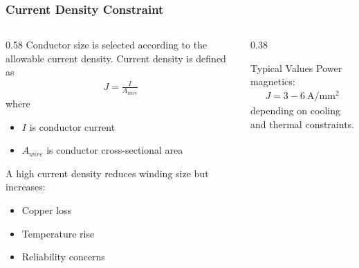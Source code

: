 \begin{frame} 
\frametitle{Current Density Constraint} 
\begin{columns} 
    \begin{column}{0.58\textwidth} 
        Conductor size is selected according to the allowable current density. 
        \vspace{0.15cm} 
        Current density is defined as 
        \begin{align} 
            J = \frac{I}{A_{wire}} 
        \end{align} 
        where 
        \begin{itemize} 
            \item $I$ is conductor current 
            \item $A_{wire}$ is conductor cross-sectional area 
        \end{itemize} 
        A high current density reduces winding size but increases: 
        \begin{itemize} 
            \item Copper loss 
            \item Temperature rise 
            \item Reliability concerns 
        \end{itemize} 
        \end{column} 
        \begin{column}{0.38\textwidth} 
            \begin{block}{Typical Values} 
                Power magnetics: 
                \begin{align} 
                    J = 3-6 \ \si{\ampere\per\milli\metre^2} 
                \end{align} 
                depending on cooling and thermal constraints. 
            \end{block} 
        \end{column} 
    \end{columns} 
\end{frame}

